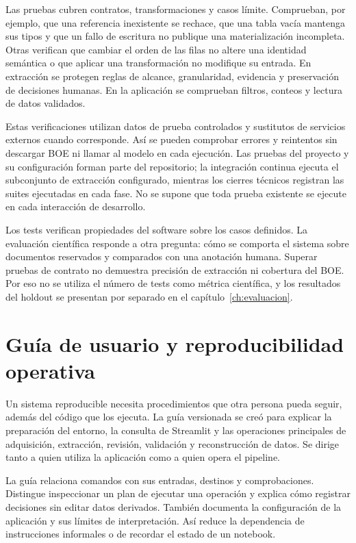 Las pruebas cubren contratos, transformaciones y casos límite. Comprueban,
por ejemplo, que una referencia inexistente se rechace, que una tabla vacía
mantenga sus tipos y que un fallo de escritura no publique una materialización
incompleta. Otras verifican que cambiar el orden de las filas no altere una
identidad semántica o que aplicar una transformación no modifique su entrada.
En extracción se protegen reglas de alcance, granularidad, evidencia y
preservación de decisiones humanas. En la aplicación se comprueban filtros,
conteos y lectura de datos validados.

Estas verificaciones utilizan datos de prueba controlados y sustitutos de
servicios externos cuando corresponde. Así se pueden comprobar errores y
reintentos sin descargar BOE ni llamar al modelo en cada ejecución. Las
pruebas del proyecto y su configuración forman parte del repositorio; la
integración continua ejecuta el subconjunto de extracción configurado, mientras
los cierres técnicos registran las suites ejecutadas en cada fase. No se
supone que toda prueba existente se ejecute en cada interacción de desarrollo.

Los tests verifican propiedades del software sobre los casos definidos.
La evaluación científica responde a otra pregunta: cómo se comporta el
sistema sobre documentos reservados y comparados con una anotación humana.
Superar pruebas de contrato no demuestra precisión de extracción ni cobertura
del BOE. Por eso no se utiliza el número de tests como métrica científica,
y los resultados del holdout se presentan por separado en el
capítulo~\ref{ch:evaluacion}.

\section{Guía de usuario y reproducibilidad operativa}
\label{sec:user-guide}
Un sistema reproducible necesita procedimientos que otra persona pueda
seguir, además del código que los ejecuta. La guía versionada
 se creó para explicar la preparación del entorno,
la consulta de Streamlit y las operaciones principales de adquisición,
extracción, revisión, validación y reconstrucción de datos. Se dirige tanto
a quien utiliza la aplicación como a quien opera el pipeline.

La guía relaciona comandos con sus entradas, destinos y comprobaciones.
Distingue inspeccionar un plan de ejecutar una operación y explica cómo
registrar decisiones sin editar datos derivados. También documenta la
configuración de la aplicación y sus límites de interpretación. Así reduce
la dependencia de instrucciones informales o de recordar el estado de un
notebook.

